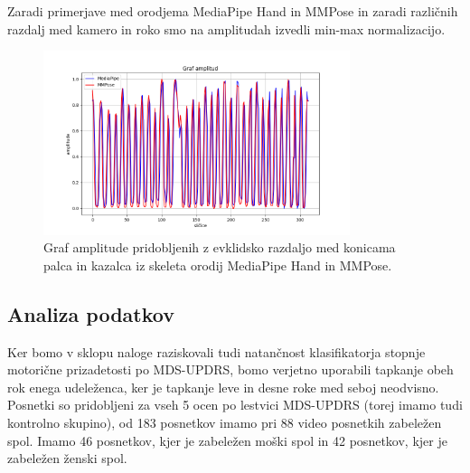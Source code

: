 \documentclass[a4paper,12pt]{article}
\begin{document}
Zaradi primerjave med orodjema MediaPipe Hand in MMPose in zaradi različnih razdalj med kamero in roko smo na 
amplitudah izvedli min-max normalizacijo.

\begin{figure}[H]
  \centering
  \includegraphics[width=0.8\textwidth]{slike/distances_plot_both.png}  
  \caption{Graf amplitude pridobljenih z evklidsko razdaljo med konicama palca in kazalca iz skeleta orodij MediaPipe Hand in MMPose.}
  \label{fig:amplituda_oba}
\end{figure}

\subsection{Analiza podatkov}

Ker bomo v sklopu naloge raziskovali tudi natančnost klasifikatorja stopnje motorične prizadetosti po MDS-UPDRS, 
bomo verjetno uporabili tapkanje obeh rok enega udeleženca, ker je tapkanje leve in desne roke med seboj neodvisno.\\

Posnetki so pridobljeni za vseh 5 ocen po lestvici MDS-UPDRS (torej imamo tudi kontrolno skupino), od 183 posnetkov 
imamo pri 88 video posnetkih zabeležen spol. Imamo 46 posnetkov, kjer je zabeležen moški spol in 42 posnetkov, kjer
je zabeležen ženski spol.
\end{document}
